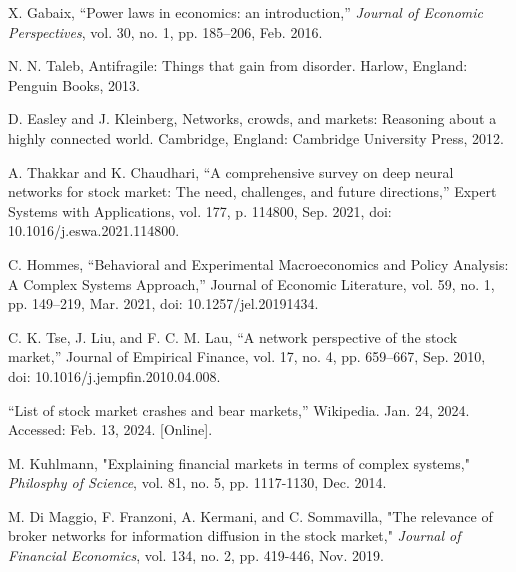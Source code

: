 \documentclass[letterpaper, 10 pt, proceedings]{ieeetran}
\begin{document}
	
	\begin{thebibliography}{99}	
		X. Gabaix, “Power laws in economics: an introduction,” \textit{Journal of Economic Perspectives}, vol. 30, no. 1, pp. 185–206, Feb. 2016.
		
		N. N. Taleb, Antifragile: Things that gain from disorder. Harlow, England: Penguin Books, 2013.
		
		D. Easley and J. Kleinberg, Networks, crowds, and markets: Reasoning about a highly connected world. Cambridge, England: Cambridge University Press, 2012.
		
		A. Thakkar and K. Chaudhari, “A comprehensive survey on deep neural networks for stock market: The need, challenges, and future directions,” Expert Systems with Applications, vol. 177, p. 114800, Sep. 2021, doi: 10.1016/j.eswa.2021.114800.
		
		C. Hommes, “Behavioral and Experimental Macroeconomics and Policy Analysis: A Complex Systems Approach,” Journal of Economic Literature, vol. 59, no. 1, pp. 149–219, Mar. 2021, doi: 10.1257/jel.20191434.
		
		C. K. Tse, J. Liu, and F. C. M. Lau, “A network perspective of the stock market,” Journal of Empirical Finance, vol. 17, no. 4, pp. 659–667, Sep. 2010, doi: 10.1016/j.jempfin.2010.04.008.
		
		“List of stock market crashes and bear markets,” Wikipedia. Jan. 24, 2024. Accessed: Feb. 13, 2024. [Online].
		
		M. Kuhlmann, "Explaining financial markets in terms of complex systems," \textit{Philosphy of Science}, vol. 81, no. 5, pp. 1117-1130, Dec. 2014. %
		
		M. Di Maggio, F. Franzoni, A. Kermani, and C. Sommavilla, "The relevance of broker networks for information diffusion in the stock market," \textit{Journal of Financial Economics}, vol. 134, no. 2, pp. 419-446, Nov. 2019. %
		

\end{thebibliography}
\end{document}
